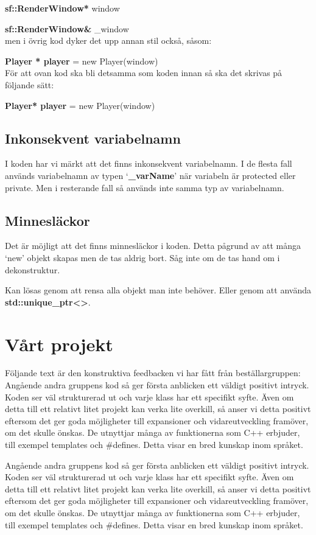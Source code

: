 \documentclass{template}
\begin{document}
\textbf{sf::RenderWindow*} window 

\textbf{sf::RenderWindow\&} \_window\\
men i övrig kod dyker det upp annan stil också, såsom:

\textbf{Player * player} = new Player(window)\\
För att ovan kod ska bli detsamma som koden innan så ska det skrivas på följande sätt:

\textbf{Player* player} = new Player(window)\\

\subsection{Inkonsekvent variabelnamn}
I koden har vi märkt att det finns inkonsekvent variabelnamn. I de flesta fall används variabelnamn av typen `\textbf{\_varName}' när variabeln är protected eller private. Men i resterande fall så används inte samma typ av variabelnamn.

\subsection{Minnesläckor}
Det är möjligt att det finns minnesläckor i koden. Detta pågrund av att många `new' objekt skapas men de tas aldrig bort. Såg inte om de tas hand om i dekonstruktur.

Kan lösas genom att rensa alla objekt man inte behöver. 
Eller genom att använda \textbf{std::unique\_ptr<>}.

\section{Vårt projekt}
Följande text är den konstruktiva feedbacken vi har fått från beställargruppen:\\

Angående andra gruppens kod så ger första anblicken ett väldigt positivt intryck. Koden ser väl strukturerad ut och varje klass har ett specifikt syfte. Även om detta till ett relativt litet projekt kan verka lite overkill, så anser vi detta positivt eftersom det ger goda möjligheter till expansioner och vidareutveckling framöver, om det skulle önskas. De utnyttjar många av funktionerna som C++ erbjuder, till exempel templates och \#defines. Detta visar en bred kunskap inom språket.

Angående andra gruppens kod så ger första anblicken ett väldigt positivt intryck. Koden ser väl strukturerad ut och varje klass har ett specifikt syfte. Även om detta till ett relativt litet projekt kan verka lite overkill, så anser vi detta positivt eftersom det ger goda möjligheter till expansioner och vidareutveckling framöver, om det skulle önskas. De utnyttjar många av funktionerna som C++ erbjuder, till exempel templates och \#defines. Detta visar en bred kunskap inom språket.
\end{document}
